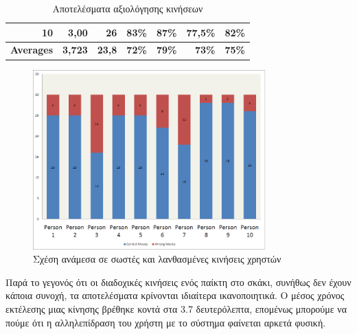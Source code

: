 \begin{table}[h]
\begin{adjustbox}{max width=\textwidth}
\begin{tabular}{|r|r|r|r|r|r|r|}
10                                                                                     & 3,00                                                                                                  & 26                                                                                                 & 83\%                               & 87\%                                & 77,5\%                                   & 82\%                               \\ \hline
{\bf Averages}                                                                         & {\bf 3,723}                                                                                           & {\bf 23,8}                                                                                         & {\bf 72\%}                         & {\bf 79\%}                          & {\bf 73\%}                               & {\bf 75\%}                         \\ \hline
\end{tabular}
\end{adjustbox}
\caption{Αποτελέσματα αξιολόγησης κινήσεων}
\end{table}





\begin{figure}[H]
    \centering
    \includegraphics[width=0.8\textwidth]{Files/Figures/correctmoves.png}
    \caption[Σχέση ανάμεσα σε σωστές και λανθασμένες κινήσεις χρηστών]{Σχέση ανάμεσα σε σωστές και λανθασμένες κινήσεις χρηστών}
    \label{fig:correctmoves}
\end{figure}



Παρά το γεγονός ότι οι διαδοχικές κινήσεις ενός παίκτη στο σκάκι, συνήθως δεν έχουν κάποια συνοχή, τα αποτελέσματα κρίνονται ιδιαίτερα ικανοποιητικά. Ο μέσος χρόνος εκτέλεσης μιας κίνησης βρέθηκε κοντά στα 3.7 δευτερόλεπτα, επομένως μπορούμε να πούμε ότι η αλληλεπίδραση του χρήστη με το σύστημα φαίνεται αρκετά φυσική. 


